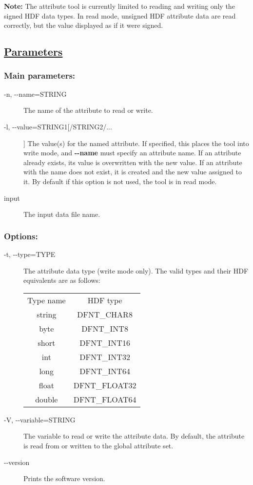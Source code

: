  \textbf{Note:}
 The attribute tool is currently limited to reading and writing only the signed HDF data types. In read mode, unsigned HDF attribute data are read correctly, but the value displayed as if it were signed.
\subsection*{\underline{Parameters}}
\subsubsection*{Main parameters:}
\begin{description}
\item[ -n, -{-}name=STRING ] The name of the attribute to read or write. 
\item[ -l, -{-}value=STRING1[/STRING2/...] ] The value(s) for the named attribute. If specified, this places the tool into write mode, and \textbf{-{-}name}
 must specify an attribute name. If an attribute already exists, its value is overwritten with the new value. If an attribute with the name does not exist, it is created and the new value assigned to it. By default if this option is not used, the tool is in read mode. 
\item[ input ] The input data file name. 

\end{description}
\subsubsection*{Options:}
\begin{description}
\item[ -t, -{-}type=TYPE ] The attribute data type (write mode only). The valid types and their HDF equivalents are as follows: 

\begin{tabular}{|c|c|}
\hline 
 & \\
 \hline 
Type name &HDF type \\
 \hline 
string &DFNT\_CHAR8 \\
 \hline 
byte &DFNT\_INT8 \\
 \hline 
short &DFNT\_INT16 \\
 \hline 
int &DFNT\_INT32 \\
 \hline 
long &DFNT\_INT64 \\
 \hline 
float &DFNT\_FLOAT32 \\
 \hline 
double &DFNT\_FLOAT64 \\
 \hline 

\end{tabular}


\item[ -V, -{-}variable=STRING ] The variable to read or write the attribute data. By default, the attribute is read from or written to the global attribute set.
\item[-{-}version]Prints the software version.

\end{description}
